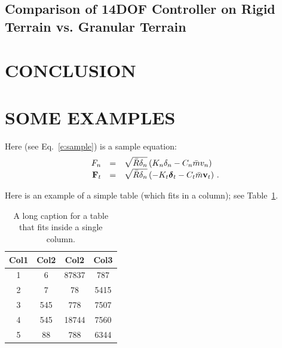 \documentclass[12pt,twocolumn]{article}
\begin{document}

\subsection{Comparison of 14DOF Controller on Rigid Terrain vs. Granular Terrain }\label{ss:Comp4}



\section{CONCLUSION	}\label{s:conclusion}


\section{SOME EXAMPLES}

Here (see Eq.~\ref{e:sample}) is a sample equation:
%
\begin{equation}\label{e:sample}
\begin{array}{rcl}
F_n &=& \sqrt{\bar{R} \delta_n} \left( K_n \delta_n - C_n \bar{m} v_n \right) \\
{\bf F}_t &=& \sqrt{\bar{R} \delta_n} \left( -K_t \boldsymbol{\delta}_t - C_t \bar{m} {\bf v}_t \right) \,.
\end{array}
\end{equation}

Here is an example of a simple table (which fits in a column); see Table~\ref{t:one_col}.
\begin{table}
\begin{center}
	\begin{tabular}{||c c c c||} 
		\hline
		Col1 & Col2 & Col2 & Col3 \\ [0.5ex] 
		\hline\hline
		1 & 6 & 87837 & 787 \\ 
		\hline
		2 & 7 & 78 & 5415 \\
		\hline
		3 & 545 & 778 & 7507 \\
		\hline
		4 & 545 & 18744 & 7560 \\
		\hline
		5 & 88 & 788 & 6344 \\ [1ex] 
		\hline
	\end{tabular}
\end{center}
\caption{A long caption for a table that fits inside a single column.}
\label{t:one_col}
\end{table}
\end{document}
